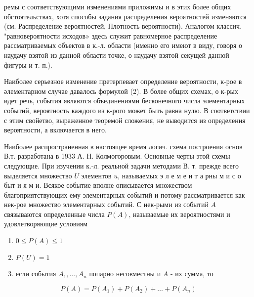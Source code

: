 \documentclass[10pt]{article}
\begin{document}
ремы с соответствующими изменениями приложимы и в этих более общих обстоятельствах, хотя способы задания распределения вероятностей изменяются (см. Распределение вероятностей, Плотность вероятности). Аналогом классич. "равновероятности исходов» здесь служит равномерное распределение рассматриваемых объектов в к.-л. области (именно его имеют в виду, говоря о наудачу взятой из данной области точке, о наудачу взятой секущей данной фигуры и т. п.).



Наиболее серьезное изменение претерпевает определение вероятности, к-рое в әлементарном случае давалось формулой (2). В более общих схемах, о к-рых идет речь, события являются объединениями бесконечного числа элементарных событий, вероятность каждого из к-рого может быть равна нулю. В соответствии с этим свойетво, выраженное теоремой сложения, не выводится из определения вероятности, а включается в него.



Наиболее распространенная в настоящее время логич. схема построения основ В.т. разработана в 1933 А. Н. Колмогоровым. Основные черты этой схемы следующие. При изучении к.-л. реальной задачи методами В. т. прежде всего выделяется множество $U$ элементов $u$, называемых э л е м е н т а рны м и с о быт и я м и. Всякое событие вполне описывается множеством благоприятствующих ему элементарных событий и потому рассматривается как нек-рое множество элементарных событий. С нек-рыми из событий $A$ связываются определенные числа $P(A)$, называемые их вероятностями и удовлетворяющие условиям



\begin{enumerate}

  \item $0 \leqslant P(A) \leqslant 1$



  \item $P(U)=1$



  \item если события $A_{1}, \ldots, A_{n}$ попарно несовместны и $A$ - их сумма, то



\end{enumerate}



\[

P(A)=P\left(A_{1}\right)+P\left(A_{2}\right)+\ldots+P\left(A_{n}\right)

\]
\end{document}
